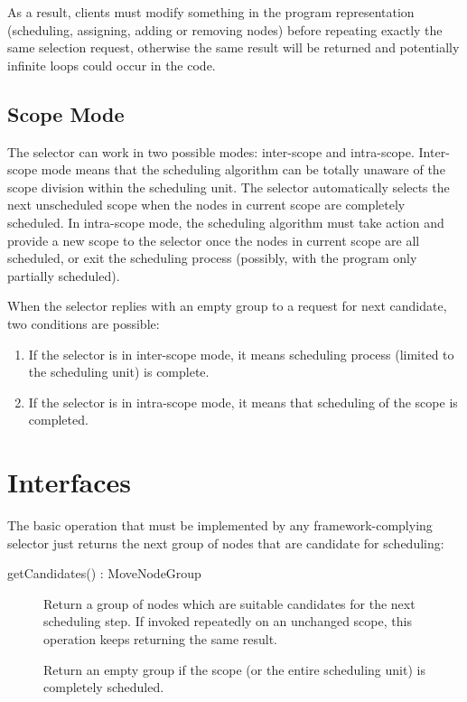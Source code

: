 \documentclass[a4paper,twoside]{tce}
\begin{document}
As a result, clients must modify something in the program representation
(scheduling, assigning, adding or removing nodes) before repeating exactly
the same selection request, otherwise the same result will be returned and
potentially infinite loops could occur in the code.
%

\subsection{Scope Mode}

The selector can work in two possible modes: inter-scope and intra-scope.
%
Inter-scope mode means that the scheduling algorithm can be totally unaware
of the scope division within the scheduling unit. The selector automatically
selects the next unscheduled scope when the nodes in current scope are
completely scheduled.
%
In intra-scope mode, the scheduling algorithm must take action and provide a
new scope to the selector once the nodes in current scope are all scheduled,
or exit the scheduling process (possibly, with the program only partially
scheduled).

When the selector replies with an empty group to a request for next
candidate, two conditions are possible:
\begin{enumerate}
\item %
  If the selector is in inter-scope mode, it means scheduling process
  (limited to the scheduling unit) is complete.
\item %
  If the selector is in intra-scope mode, it means that scheduling of the
  scope is completed.
\end{enumerate}

\section{Interfaces}
\label{sec:Selector-if}

The basic operation that must be implemented by any framework-complying
selector just returns the next group of nodes that are candidate for
scheduling:
\begin{description}
\item[getCandidates() : MoveNodeGroup]%
  Return a group of nodes which are suitable candidates for the next
  scheduling step. If invoked repeatedly on an unchanged scope, this
  operation keeps returning the same result.

  Return an empty group if the scope (or the entire scheduling unit) is
  completely scheduled.
\end{description}
\end{document}
